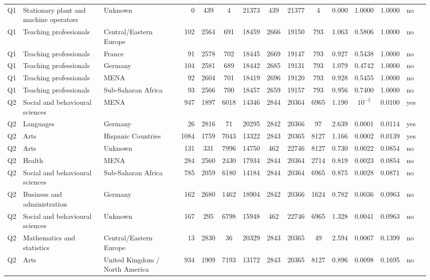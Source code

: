 \begin{longtable}{lllrcccccccccll}
Q1 & Stationary plant and machine operators & Unknown & 0 & 439 & 4 & 21373 & 439 & 21377 & 4 & 0.000 & 1.0000 & 1.0000 & no \\
Q1 & Teaching professionals & Central/Eastern Europe & 102 & 2564 & 691 & 18459 & 2666 & 19150 & 793 & 1.063 & 0.5806 & 1.0000 & no \\
Q1 & Teaching professionals & France & 91 & 2578 & 702 & 18445 & 2669 & 19147 & 793 & 0.927 & 0.5438 & 1.0000 & no \\
Q1 & Teaching professionals & Germany & 104 & 2581 & 689 & 18442 & 2685 & 19131 & 793 & 1.079 & 0.4742 & 1.0000 & no \\
Q1 & Teaching professionals & MENA & 92 & 2604 & 701 & 18419 & 2696 & 19120 & 793 & 0.928 & 0.5455 & 1.0000 & no \\
Q1 & Teaching professionals & Sub-Saharan Africa & 93 & 2566 & 700 & 18457 & 2659 & 19157 & 793 & 0.956 & 0.7400 & 1.0000 & no \\
Q2 & Social and behavioural sciences & MENA & 947 & 1897 & 6018 & 14346 & 2844 & 20364 & 6965 & 1.190 & $10^{-5}$ & 0.0100 & yes \\
Q2 & Languages & Germany & 26 & 2816 & 71 & 20295 & 2842 & 20366 & 97 & 2.639 & 0.0001 & 0.0114 & yes \\
Q2 & Arts & Hispanic Countries & 1084 & 1759 & 7043 & 13322 & 2843 & 20365 & 8127 & 1.166 & 0.0002 & 0.0139 & yes \\
Q2 & Arts & Unknown & 131 & 331 & 7996 & 14750 & 462 & 22746 & 8127 & 0.730 & 0.0022 & 0.0854 & no \\
Q2 & Health & MENA & 284 & 2560 & 2430 & 17934 & 2844 & 20364 & 2714 & 0.819 & 0.0023 & 0.0854 & no \\
Q2 & Social and behavioural sciences & Sub-Saharan Africa & 785 & 2059 & 6180 & 14184 & 2844 & 20364 & 6965 & 0.875 & 0.0028 & 0.0871 & no \\
Q2 & Business and administration & Germany & 162 & 2680 & 1462 & 18904 & 2842 & 20366 & 1624 & 0.782 & 0.0036 & 0.0963 & no \\
Q2 & Social and behavioural sciences & Unknown & 167 & 295 & 6798 & 15948 & 462 & 22746 & 6965 & 1.328 & 0.0041 & 0.0963 & no \\
Q2 & Mathematics and statistics & Central/Eastern Europe & 13 & 2830 & 36 & 20329 & 2843 & 20365 & 49 & 2.594 & 0.0067 & 0.1399 & no \\
Q2 & Arts & United Kingdom / North America & 934 & 1909 & 7193 & 13172 & 2843 & 20365 & 8127 & 0.896 & 0.0098 & 0.1695 & no \\

\end{longtable}
